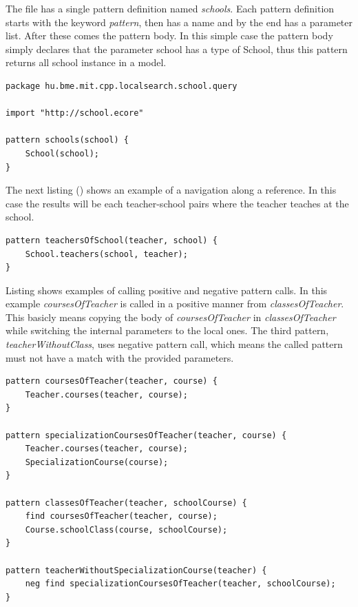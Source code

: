 The file has a single pattern definition named \emph{schools}. Each pattern
definition starts with the keyword \emph{pattern}, then has a name and by the
end has a parameter list. After these comes the pattern body. In this simple
case the pattern body simply declares that the parameter school has a type of
School, thus this pattern returns all school instance in a model.

\begin{lstlisting}[frame=single, language=IQPL,
label=listing:SimpleIQPLExample, caption=A simple query defined in \EIQ pattern
language]
package hu.bme.mit.cpp.localsearch.school.query

import "http://school.ecore"

pattern schools(school) {
	School(school);
}
\end{lstlisting}

The next listing () shows an example of a
navigation along a reference. In this case the results will be each
teacher-school pairs where the teacher teaches at the school.

\begin{lstlisting}[frame=single, language=IQPL,
label=listing:NavigationIQPLExample, caption=An example of a query along
reference] 
pattern teachersOfSchool(teacher, school) {
	School.teachers(school, teacher); 
}
\end{lstlisting}

Listing  shows examples of calling positive and
negative pattern calls. In this example \emph{coursesOfTeacher} is called in a
positive manner from \emph{classesOfTeacher}. This basicly means copying the
body of \emph{coursesOfTeacher} in \emph{classesOfTeacher} while switching the
internal parameters to the local ones. The third pattern,
\emph{teacherWithoutClass}, uses negative pattern call, which means the called
pattern must not have a match with the provided parameters.

\begin{lstlisting}[frame=single, language=IQPL,
label=listing:PatternCallIQPLExample, caption=Pattern call example] 
pattern coursesOfTeacher(teacher, course) {
	Teacher.courses(teacher, course);
}

pattern specializationCoursesOfTeacher(teacher, course) {
	Teacher.courses(teacher, course);
	SpecializationCourse(course);
}  
 
pattern classesOfTeacher(teacher, schoolCourse) {
	find coursesOfTeacher(teacher, course);
	Course.schoolClass(course, schoolCourse);
}
 
pattern teacherWithoutSpecializationCourse(teacher) {
	neg find specializationCoursesOfTeacher(teacher, schoolCourse); 	
}
\end{lstlisting}

